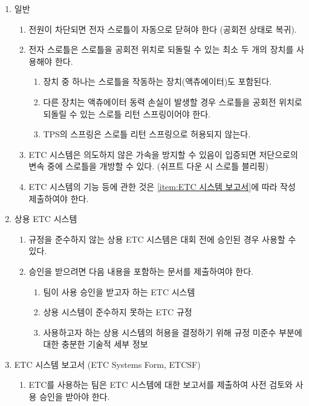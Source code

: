 \documentclass[final,a4paper,10pt]{report}
\begin{document}
\begin{enumerate}
  \item 일반
    \begin{enumerate}
      \item 전원이 차단되면 전자 스로틀이 자동으로 닫혀야 한다 (공회전 상태로 복귀).
      
      \item 전자 스로틀은 스로틀을 공회전 위치로 되돌릴 수 있는 최소 두 개의 장치를 사용해야 한다.
        \begin{enumerate}
          \item 장치 중 하나는 스로틀을 작동하는 장치(액츄에이터)도 포함된다.
          \item 다른 장치는 액츄에이터 동력 손실이 발생할 경우 스로틀을 공회전 위치로 되돌릴 수 있는 스로틀 리턴 스프링이어야 한다.
          \item TPS의 스프링은 스로틀 리턴 스프링으로 허용되지 않는다.
        \end{enumerate}
        
      \item ETC 시스템은 의도하지 않은 가속을 방지할 수 있음이 입증되면 저단으로의 변속 중에 스로틀을 개방할 수 있다. (쉬프트 다운 시 스로틀 블리핑)
      \item ETC 시스템의 기능 등에 관한 것은 \cref{item:ETC 시스템 보고서}에 따라 작성 제출하여야 한다.
    \end{enumerate}
    
  \item 상용 ETC 시스템
    \begin{enumerate}
      \item 규정을 준수하지 않는 상용 ETC 시스템은 대회 전에 승인된 경우 사용할 수 있다.
      
      \item 승인을 받으려면 다음 내용을 포함하는 문서를 제출하여야 한다.
        \begin{enumerate}
          \item 팀이 사용 승인을 받고자 하는 ETC 시스템
          \item 상용 시스템이 준수하지 못하는 ETC 규정
          \item 사용하고자 하는 상용 시스템의 허용을 결정하기 위해 규정 미준수 부분에 대한 충분한 기술적 세부 정보
        \end{enumerate}
    \end{enumerate}
    
  \item ETC 시스템 보고서 (ETC Systems Form, ETCSF) \label{item:ETC 시스템 보고서}
    \begin{enumerate}
      \item ETC를 사용하는 팀은 ETC 시스템에 대한 보고서를 제출하여 사전 검토와 사용 승인을 받아야 한다.
      

\end{enumerate}
\end{enumerate}
\end{document}
